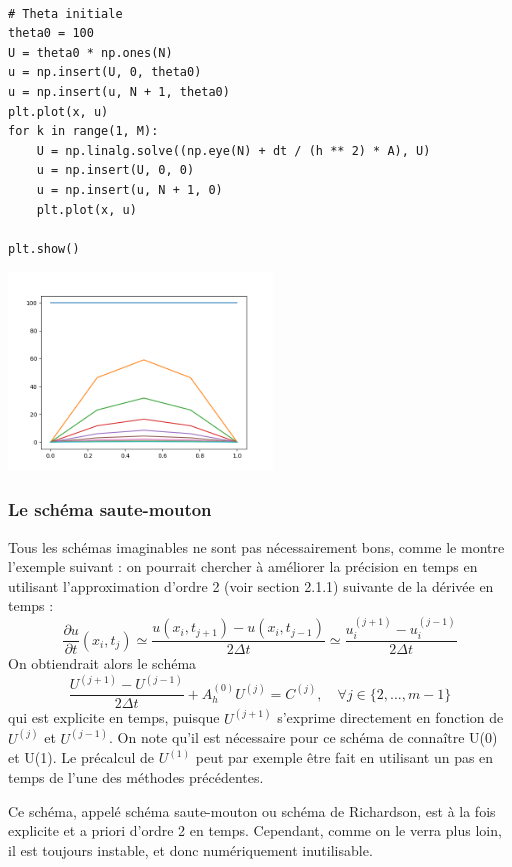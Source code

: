 \documentclass{beamer}
\begin{document}
 \begin{frame}[fragile] 
\begin{lstlisting}

# Theta initiale
theta0 = 100
U = theta0 * np.ones(N)
u = np.insert(U, 0, theta0)
u = np.insert(u, N + 1, theta0)
plt.plot(x, u)
for k in range(1, M):
    U = np.linalg.solve((np.eye(N) + dt / (h ** 2) * A), U)
    u = np.insert(U, 0, 0)
    u = np.insert(u, N + 1, 0)
    plt.plot(x, u)

plt.show()
  \end{lstlisting}

\end{frame}

\begin{frame}
 \begin{center}
\includegraphics[width=7cm]{chaleur2.png}
\end{center}
\end{frame}
  
   
  
  
  
 \begin{frame}    
  \frametitle{ Le schéma saute-mouton}
Tous les schémas imaginables ne sont pas nécessairement bons, comme le montre l'exemple suivant : on pourrait chercher à améliorer la précision en temps en utilisant l'approximation d'ordre 2 (voir section 2.1.1) suivante de la dérivée en temps :
\[\frac{\partial u}{\partial t}(x_i,t_j) \simeq \frac{u(x_{i},t_{j+1})-u(x_{i},t_{j-1})}{2\Delta t}\simeq
\frac{u_{i}^{(j+1)}-u_{i}^{(j-1)} }{2\Delta t}\]
On obtiendrait alors le schéma
 \begin{equation}
   \frac{U^{(j+1)}-U^{(j-1)} }{2\Delta t} +A_h^{(0)}U^{(j)} =C^{(j)} , \quad \forall j\in\{2,...,m-1\} 
   \end{equation}
 qui est explicite en temps, puisque $U^{(j+1)}$ s'exprime directement en fonction de $U^{(j)}$ et $U^{(j-1)}$. On note qu'il est nécessaire pour ce schéma de connaître U(0) et U(1). Le précalcul de $U^{(1)}$ peut par exemple être fait en utilisant un pas en temps de l'une des méthodes précédentes.
 
Ce schéma, appelé schéma saute-mouton ou schéma de Richardson, est à la fois explicite et a priori d'ordre 2 en temps. Cependant, comme on le verra plus loin, il est toujours instable, et donc numériquement inutilisable.
  \end{frame}
  
\end{document}
